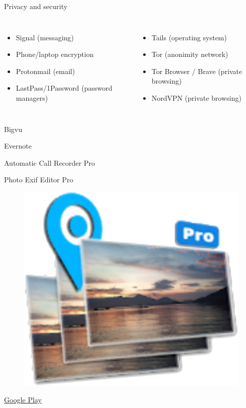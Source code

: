 \documentclass[serif,14pt,color=usenames,dvipsnames]{beamer}
\begin{document}
\begin{frame}{Privacy and security}
  \small
  \begin{columns}
    \begin{itemize}
      \item Signal (messaging)
      \item Phone/laptop encryption
      \item Protonmail (email)
      \item LastPass/1Password (password managers)
    \end{itemize}
    \begin{itemize}
      \item Tails (operating system)
      \item Tor (anonimity network)
      \item Tor Browser / Brave (private browsing)
      \item NordVPN (private browsing)
    \end{itemize}
  \end{columns}

\end{frame}

\begin{frame}{Bigvu}
\end{frame}

\begin{frame}{Evernote}
\end{frame}

\begin{frame}{Automatic Call Recorder Pro}
\end{frame}



\begin{frame}{Photo Exif Editor Pro}
  \centering

  \begin{figure}
  \includegraphics[width=0.3\linewidth]{imgs/exif}
  \end{figure}

  \href{https://play.google.com/store/apps/details?id=net.xnano.android.photoexifeditor}{Google
  Play }
\end{frame}
\end{document}
